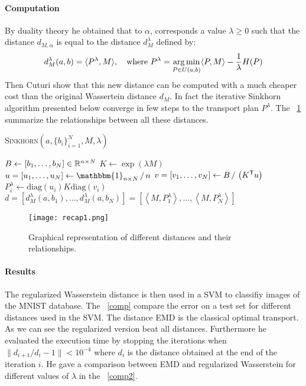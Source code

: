 \paragraph{Computation}
By duality theory he obtained that to $\alpha$, corresponds a value $\lambda \geqslant 0$ such that the distance $d_{M, \alpha}$ is equal to the distance $d_M^\lambda$ defined by:
$$ d_M^\lambda(a, b) = \langle P^\lambda, M \rangle, \quad \text{where } P^\lambda = \operatorname*{arg\,min}_{P \in U(a, b)} \langle P, M \rangle - \dfrac{1}{\lambda} H(P) $$
Then Cuturi show that this new distance can be computed with a much cheaper cost than the original Wassertein distance $d_M$. In fact the iterative Sinkhorn algorithm presented below converge in few steps to the transport plan $P^\lambda$. The \figurename~\ref{recap1} summarize the relationships between all these distances.

\vspace{3mm}
\begin{algorithm}[H]
	\caption{\textsc{Sinkhorn}$\left( a, \{ b_i \}_{i=1}^N, M, \lambda \right)$}
	$B \gets \left[ b_1, \dots, b_N \right] \in \mathbb{R}^{n \times N}$ \;
	$K \gets \exp \left( \lambda M \right)$ \;
	$u = \left[ u_1, \dots, u_N \right] \gets \mathbbm{1}_{n \times N} \, / \, n$ \;
	$v = \left[ v_1, \dots, v_N \right] \gets B \, / \, \left( K^{\mathsf{T}} u \right)$ \;
	$P^\lambda_i \gets \text{diag}(u_i) K \text{diag}(v_i)$ \;
	\Return $d = \left[ d_M^\lambda(a, b_1), \dots, d_M^\lambda(a, b_N) \right] = \left[ \left\langle M, P^\lambda_1 \right\rangle, \dots, \left\langle M, P^\lambda_N \right\rangle \right]$
\end{algorithm}
\vspace{3mm}

\begin{figure}
	\centering
	\texttt{[image: recap1.png]}
	\captionsetup{justification=centering}
	\caption{Graphical representation of different distances and their relationships.}
	\label{recap1}
\end{figure}

\paragraph{Results}
The regularized Wasserstein distance is then used in a SVM to classifiy images of the MNIST database. The \figurename~\ref{comp} compare the error on a test set for different distances used in the SVM. The distance EMD is the classical optimal transport. As we can see the regularized version beat all distances. Furthermore he evaluated the execution time by stopping the iterations when $\| d_{i+1} / d_i - 1 \| < 10^{-4}$ where $d_i$ is the distance obtained at the end of the iteration $i$. He gave a comparison between EMD and regularized Wasserstein for different values of $\lambda$ in the \figurename~\ref{comp2}.

